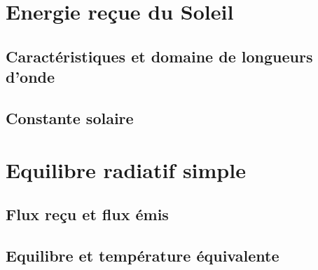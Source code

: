 \documentclass[a4paper,DIV16,10pt]{scrartcl}
\begin{document}
 \inidoc


\mk \section{Energie reçue du Soleil}
	\sk \subsection{Caractéristiques et domaine de longueurs d'onde}
		
	\sk \subsection{Constante solaire}
		
		

\mk \section{Equilibre radiatif simple}
	\sk \subsection{Flux reçu et flux émis}
		
	\sk \subsection{Equilibre et température équivalente}
		
		
\end{document}
